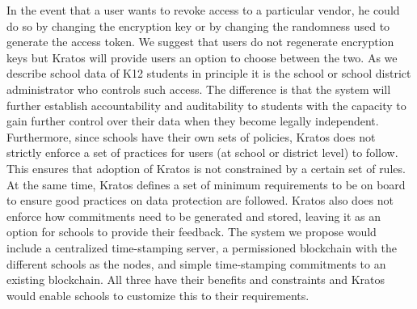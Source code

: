 \documentclass{article}
\begin{document}
\bigbreak
In the event that a user wants to revoke access to a particular vendor, he could do so by changing the encryption key or by changing the randomness used to generate the access token. We suggest that users do not regenerate encryption keys but Kratos will provide users an option to choose between the two. As we describe school data of K12 students in principle it is the school or school district administrator who controls such access. The difference is that the system will further establish accountability and auditability to students with the capacity to gain further control over their data when they become legally independent.
\bigbreak
Furthermore, since schools have their own sets of policies, Kratos does not strictly enforce a set of practices for users (at school or district level) to follow. This ensures that adoption of Kratos is not constrained by a certain set of rules. At the same time, Kratos defines a set of minimum requirements to be on board to ensure good practices on data protection are followed.
\bigbreak
Kratos also does not enforce how commitments need to be generated and stored, leaving it as an option for schools to provide their feedback. The system we propose would include a centralized time-stamping server, a permissioned blockchain with the different schools as the nodes, and simple time-stamping commitments to an existing blockchain. All three have their benefits and constraints and Kratos would enable schools to customize this to their requirements.
\bigbreak
\end{document}
